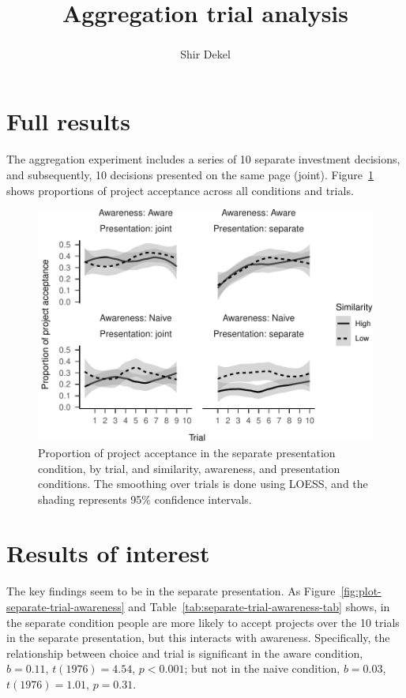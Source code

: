 \documentclass[
  english,
  man, donotrepeattitle,floatsintext]{apa7}
\title{Aggregation trial analysis}
\author{Shir Dekel\textsuperscript{}}
\date{}
\affiliation{\phantom{0}}
\begin{document}
\maketitle

\hypertarget{full-results}{%
\section{Full results}\label{full-results}}

The aggregation experiment includes a series of 10 separate investment decisions, and subsequently, 10 decisions presented on the same page (joint). Figure~\ref{fig:plot-full} shows proportions of project acceptance across all conditions and trials.

\begin{figure}
\centering
\includegraphics{aggregation_trials_files/figure-latex/plot-full-1.pdf}
\caption{\label{fig:plot-full}Proportion of project acceptance in the separate presentation condition, by trial, and similarity, awareness, and presentation conditions. The smoothing over trials is done using LOESS, and the shading represents 95\% confidence intervals.}
\end{figure}

\hypertarget{results-of-interest}{%
\section{Results of interest}\label{results-of-interest}}

The key findings seem to be in the separate presentation. As Figure~\ref{fig:plot-separate-trial-awareness} and Table~\ref{tab:separate-trial-awareness-tab} shows, in the separate condition people are more likely to accept projects over the 10 trials in the separate presentation, but this interacts with awareness. Specifically, the relationship between choice and trial is significant in the aware condition, \(b = 0.11\), \(t(1976) = 4.54\), \(p < 0.001\); but not in the naive condition, \(b = 0.03\), \(t(1976) = 1.01\), \(p = 0.31\).
\end{document}
